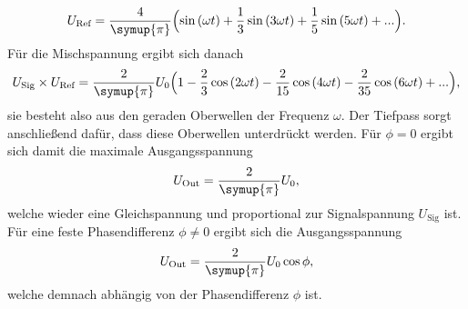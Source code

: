     \begin{equation*}
        U_\text{Ref} = \frac{4}{\symup{\pi}} \Bigl(\sin{(\omega t)} + \frac{1}{3}\sin{(3\omega t)} + \frac{1}{5}\sin{(5\omega t)} + ... \Bigr) .
    \end{equation*}
    Für die Mischspannung ergibt sich danach
    \begin{equation*}
        U_\text{Sig} \times U_\text{Ref} = \frac{2}{\symup{\pi}} U_0 \Bigl(1 - \frac{2}{3}\cos{(2\omega t)} - \frac{2}{15}\cos{(4\omega t)} - \frac{2}{35}\cos{(6\omega t)} + ... \Bigr) ,
    \end{equation*}
    sie besteht also aus den geraden Oberwellen der Frequenz $\omega$.
    Der Tiefpass sorgt anschließend dafür,
    dass diese Oberwellen unterdrückt werden.
    Für $\phi = 0$ ergibt sich damit die maximale Ausgangsspannung 
    \begin{equation*}
        U_\text{Out} = \frac{2}{\symup{\pi}} U_0 ,
    \end{equation*}
    welche wieder eine Gleichspannung und proportional zur Signalspannung $U_\text{Sig}$ ist.
    Für eine feste Phasendifferenz $\phi \neq 0$ ergibt sich die Ausgangsspannung
    \begin{equation}
        U_\text{Out} = \frac{2}{\symup{\pi}} U_0 \cos{\phi} ,
        \label{eqn:ausgangsspannung_phase}
    \end{equation}
    welche demnach abhängig von der Phasendifferenz $\phi$ ist.
    